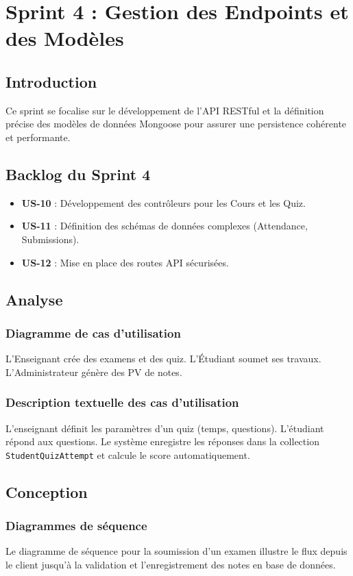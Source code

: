 \chapter{Sprint 4 : Gestion des Endpoints et des Modèles}

\section{Introduction}
Ce sprint se focalise sur le développement de l'API RESTful et la définition précise des modèles de données Mongoose pour assurer une persistence cohérente et performante.

\section{Backlog du Sprint 4}
\begin{itemize}
    \item \textbf{US-10} : Développement des contrôleurs pour les Cours et les Quiz.
    \item \textbf{US-11} : Définition des schémas de données complexes (Attendance, Submissions).
    \item \textbf{US-12} : Mise en place des routes API sécurisées.
\end{itemize}

\section{Analyse}
\subsection{Diagramme de cas d'utilisation}
L'Enseignant crée des examens et des quiz. L'Étudiant soumet ses travaux. L'Administrateur génère des PV de notes.

\subsection{Description textuelle des cas d'utilisation}
L'enseignant définit les paramètres d'un quiz (temps, questions). L'étudiant répond aux questions. Le système enregistre les réponses dans la collection \texttt{StudentQuizAttempt} et calcule le score automatiquement.

\section{Conception}
\subsection{Diagrammes de séquence}
Le diagramme de séquence pour la soumission d'un examen illustre le flux depuis le client jusqu'à la validation et l'enregistrement des notes en base de données.

